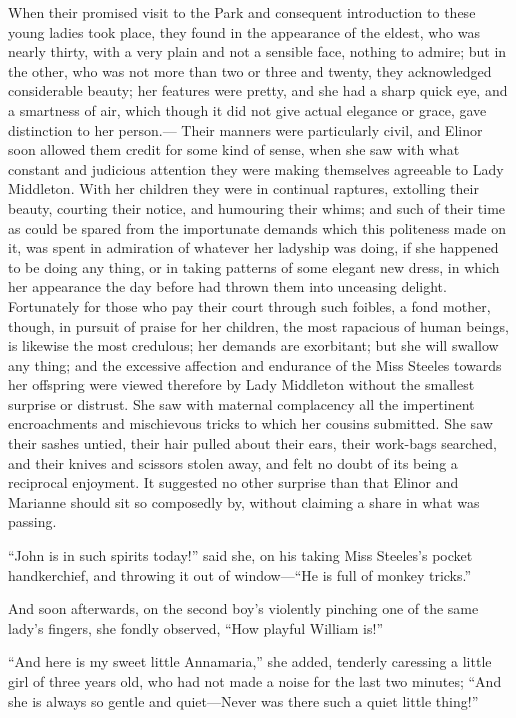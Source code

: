 \documentclass{article}
\begin{document}
When their promised visit to the Park and consequent
introduction to these young ladies took place, they found
in the appearance of the eldest, who was nearly thirty,
with a very plain and not a sensible face, nothing to admire;
but in the other, who was not more than two or three
and twenty, they acknowledged considerable beauty; her
features were pretty, and she had a sharp quick eye,
and a smartness of air, which though it did not give
actual elegance or grace, gave distinction to her person.---%
Their manners were particularly civil, and Elinor soon
allowed them credit for some kind of sense, when she
saw with what constant and judicious attention they
were making themselves agreeable to Lady Middleton.
With her children they were in continual raptures,
extolling their beauty, courting their notice, and humouring
their whims; and such of their time as could be spared from
the importunate demands which this politeness made on it,
was spent in admiration of whatever her ladyship was doing,
if she happened to be doing any thing, or in taking patterns
of some elegant new dress, in which her appearance
the day before had thrown them into unceasing delight.
Fortunately for those who pay their court through
such foibles, a fond mother, though, in pursuit of praise
for her children, the most rapacious of human beings,
is likewise the most credulous; her demands are exorbitant;
but she will swallow any thing; and the excessive
affection and endurance of the Miss Steeles towards
her offspring were viewed therefore by Lady Middleton
without the smallest surprise or distrust.  She saw with
maternal complacency all the impertinent encroachments
and mischievous tricks to which her cousins submitted.
She saw their sashes untied, their hair pulled about
their ears, their work-bags searched, and their knives
and scissors stolen away, and felt no doubt of its being
a reciprocal enjoyment.  It suggested no other surprise
than that Elinor and Marianne should sit so composedly by,
without claiming a share in what was passing.

``John is in such spirits today!'' said she, on his
taking Miss Steeles's pocket handkerchief, and throwing
it out of window---``He is full of monkey tricks.''

And soon afterwards, on the second boy's violently
pinching one of the same lady's fingers, she fondly observed,
``How playful William is!''

``And here is my sweet little Annamaria,'' she added,
tenderly caressing a little girl of three years old,
who had not made a noise for the last two minutes;
``And she is always so gentle and quiet---Never was there
such a quiet little thing!''
\end{document}
